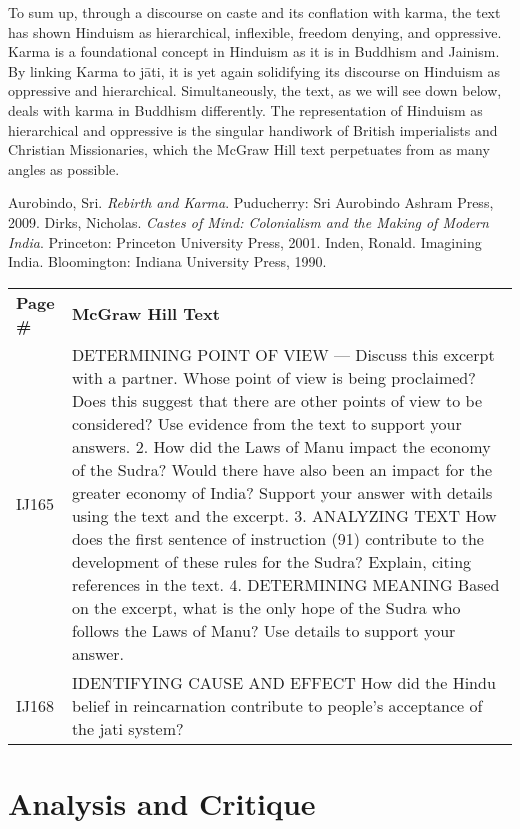To sum up, through a discourse on caste and its conflation with karma, the text has shown Hinduism as hierarchical, inflexible, freedom denying, and oppressive. Karma is a foundational concept in Hinduism as it is in Buddhism and Jainism. By linking Karma to jāti, it is yet again solidifying its discourse on Hinduism as oppressive and hierarchical. Simultaneously, the text, as we will see down below, deals with karma in Buddhism differently. The representation of Hinduism as hierarchical and oppressive is the singular handiwork of British imperialists and Christian Missionaries, which the McGraw Hill text perpetuates from as many angles as possible.

\begin{thebibliography}{99}
 Aurobindo, Sri. \textit{Rebirth and Karma}. Puducherry: Sri Aurobindo Ashram Press, 2009.
 Dirks, Nicholas. \textit{Castes of Mind: Colonialism and the Making of Modern India}. Princeton: Princeton University Press, 2001.
 Inden, Ronald. Imagining India. Bloomington: Indiana University Press, 1990.
\end{thebibliography}
\newpage

\begin{longtable}{|>{\raggedleft}p{1.5cm}|p{8.5cm}|}
\multicolumn{2}{c}{\textbf{Table: 8}}\\ 
\hline
\textbf{Page \#} & \textbf{McGraw Hill Text} \tabularnewline
\hline
IJ165 & DETERMINING POINT OF VIEW — Discuss this excerpt with a partner. Whose point of view is being proclaimed? Does this suggest that there are other points of view to be considered? Use evidence from the text to support your answers. 2. How did the Laws of Manu impact the economy of the Sudra? Would there have also been an impact for the greater economy of India? Support your answer with details using the text and the excerpt. 3. ANALYZING TEXT How does the first sentence of instruction (91) contribute to the development of these rules for the Sudra? Explain, citing references in the text. 4. DETERMINING MEANING Based on the excerpt, what is the only hope of the Sudra who follows the Laws of Manu? Use details to support your answer. \tabularnewline
\hline
IJ168 & IDENTIFYING CAUSE AND EFFECT How did the Hindu belief in reincarnation contribute to people’s acceptance of the jati system? \tabularnewline
\hline
\end{longtable}

\section*{Analysis and Critique} 

